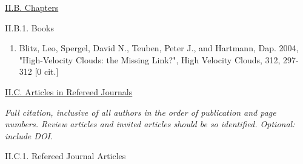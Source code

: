 \documentclass[11pt,letterpaper]{article}
\begin{document}






\underline{II.B. Chapters}

II.B.1. Books

\begin{enumerate}[resume,label=\textbf{\arabic*}.]  
\item
Blitz, Leo, Spergel, David N., Teuben, Peter J., and Hartmann, Dap.  2004,  
"High-Velocity Clouds: the Missing Link?", High Velocity Clouds,  312,  
297-312 [0 cit.] 
\end{enumerate}







\underline{II.C. Articles in Refereed Journals}

\textit{Full citation, inclusive of all authors in the order of publication and page numbers. Review articles and invited articles should be so identified. Optional: include DOI.}

II.C.1. Refereed Journal Articles

\end{document}
